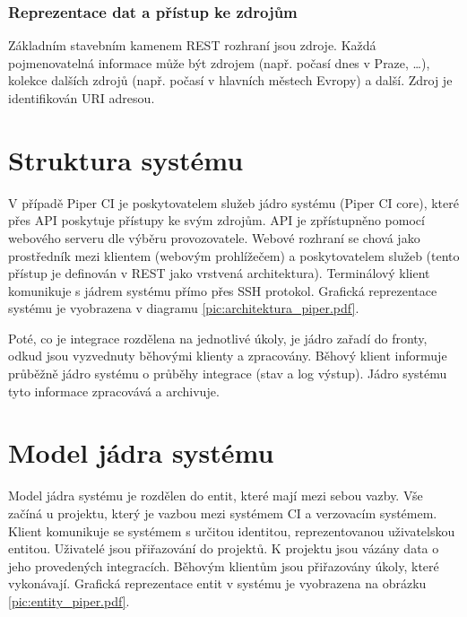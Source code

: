 \subsubsection{Reprezentace dat a přístup ke zdrojům}

Základním stavebním kamenem REST rozhraní jsou zdroje.
Každá pojmenovatelná informace může být zdrojem (např. počasí dnes v Praze, \ldots), kolekce dalších zdrojů (např. počasí v hlavních městech Evropy) a další.
Zdroj je identifikován URI adresou.
\cite{rest_zdroje}

\section{Struktura systému}

V případě Piper CI je poskytovatelem služeb jádro systému (Piper CI core), které přes API poskytuje přístupy ke svým zdrojům.
API je zpřístupněno pomocí webového serveru dle výběru provozovatele.
Webové rozhraní se chová jako prostředník mezi klientem (webovým prohlížečem) a poskytovatelem služeb (tento přístup je definován v REST jako vrstvená architektura).
Terminálový klient komunikuje s jádrem systému přímo přes SSH protokol.
Grafická reprezentace systému je vyobrazena v diagramu \ref{pic:architektura_piper.pdf}.


Poté, co je integrace rozdělena na jednotlivé úkoly, je jádro zařadí do fronty, odkud jsou vyzvednuty běhovými klienty a zpracovány.
Běhový klient informuje průběžně jádro systému o průběhy integrace (stav a log výstup).
Jádro systému tyto informace zpracovává a archivuje.

\section{Model jádra systému}

Model jádra systému je rozdělen do entit, které mají mezi sebou vazby.
Vše začíná u projektu, který je vazbou mezi systémem CI a verzovacím systémem.
Klient komunikuje se systémem s určitou identitou, reprezentovanou uživatelskou entitou.
Uživatelé jsou přiřazování do projektů.
K projektu jsou vázány data o jeho provedených integracích.
Běhovým klientům jsou přiřazovány úkoly, které vykonávají.
Grafická reprezentace entit v systému je vyobrazena na obrázku \ref{pic:entity_piper.pdf}.


